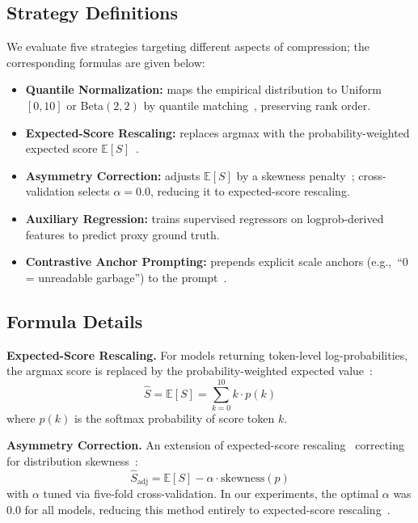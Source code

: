 \documentclass[11pt]{article}
\newcommand{\eg}{e.g.,\ }
\begin{document}
\subsection{Strategy Definitions}

We evaluate five strategies targeting different aspects of compression;
the corresponding formulas are given below:
\begin{itemize}
    \item \textbf{Quantile Normalization:} maps the empirical
    distribution to Uniform$[0,10]$ or Beta$(2,2)$ by quantile
    matching~\citep{bolstad2003comparison}, preserving rank order.
    \item \textbf{Expected-Score Rescaling:} replaces argmax with the
    probability-weighted expected score $\mathbb{E}[S]$~\citep{liu2023geval}.
    \item \textbf{Asymmetry Correction:} adjusts $\mathbb{E}[S]$ by a
    skewness penalty~\citep{liu2023geval}; cross-validation selects
    $\alpha=0.0$, reducing it to expected-score rescaling.
    \item \textbf{Auxiliary Regression:} trains supervised regressors on
    logprob-derived features to predict proxy ground truth.
    \item \textbf{Contrastive Anchor Prompting:} prepends explicit scale
    anchors (\eg ``0 = unreadable garbage'') to the prompt~\citep{zheng2023judging,liu2023geval}.
\end{itemize}

\subsection{Formula Details}


\textbf{Expected-Score Rescaling.} For models returning token-level
log-probabilities, the argmax score is replaced by the
probability-weighted expected value~\citep{liu2023geval}:
\begin{equation}
    \hat{S} = \mathbb{E}[S] = \sum_{k=0}^{10} k \cdot p(k)
\end{equation}
where $p(k)$ is the softmax probability of score token $k$.

\textbf{Asymmetry Correction.} An extension of expected-score
rescaling~\citep{liu2023geval} correcting for distribution
skewness~\citep{stevens1971issues}:
\begin{equation}
    \hat{S}_{\text{adj}} = \mathbb{E}[S] - \alpha \cdot
    \text{skewness}(p)
\end{equation}
with $\alpha$ tuned via five-fold cross-validation. In our
experiments, the optimal $\alpha$ was 0.0 for all models, reducing
this method entirely to expected-score rescaling~\citep{liu2023geval}.
\end{document}
